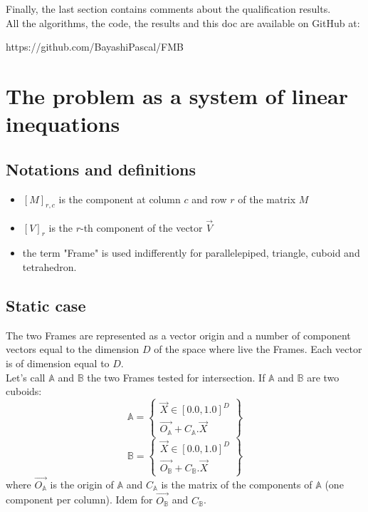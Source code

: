 \documentclass[12pt, a4paper]{article}
\begin{document}
Finally, the last section contains comments about the qualification results.\\

All the algorithms, the code, the results and this doc are available on GitHub at:
\begin{center}
https://github.com/BayashiPascal/FMB
 \end{center}
 
\section{The problem as a system of linear inequations}

\subsection{Notations and definitions}

\begin{itemize}
\item{$\left[M\right]_{r,c}$ is the component at column $c$ and row $r$ of the matrix $M$}
\item{$\left[V\right]_r$ is the $r$-th component of the vector $\overrightarrow{V}$}
\item the term "Frame" is used indifferently for parallelepiped, triangle, cuboid and tetrahedron.
\end{itemize}

\subsection{Static case}

The two Frames are represented as a vector origin and a number of component vectors equal to the dimension $D$ of the space where live the Frames. Each vector is of dimension equal to $D$.\\

Let's call $\mathbb{A}$ and $\mathbb{B}$ the two Frames tested for intersection. If $\mathbb{A}$ and $\mathbb{B}$ are two cuboids:
\begin{equation}
\mathbb{A}=\left\lbrace
\begin{array}{c}
\overrightarrow{X}\in[0.0,1.0]^D\\
\overrightarrow{O_\mathbb{A}}+C_\mathbb{A}.\overrightarrow{X}
\end{array}
\right\rbrace
\end{equation}
\begin{equation}
\mathbb{B}=\left\lbrace
\begin{array}{c}
\overrightarrow{X}\in[0.0,1.0]^D\\
\overrightarrow{O_\mathbb{B}}+C_\mathbb{B}.\overrightarrow{X}
\end{array}
\right\rbrace
\end{equation}
where $\overrightarrow{O_\mathbb{A}}$ is the origin of $\mathbb{A}$ and $C_\mathbb{A}$ is the matrix of the components of $\mathbb{A}$ (one component per column). Idem for $\overrightarrow{O_\mathbb{B}}$ and $C_\mathbb{B}$.\\
\end{document}
